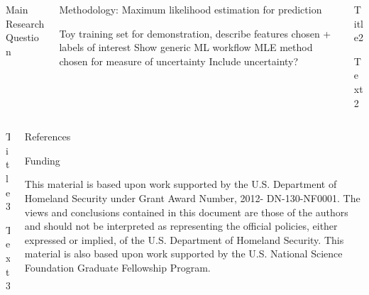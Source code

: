 \documentclass{beamer}
\begin{document}
\begin{frame}[t]{}
\begin{columns}
\begin{column}[T]{0.72\textwidth}
\begin{columns}[t]
\begin{column}{0.32\textwidth}
\begin{block}{Main Research Question}
\end{block}
\end{column}

\begin{column}{0.42\textwidth}
\begin{block}{Methodology: Maximum likelihood estimation for prediction}

Toy training set for demonstration, describe features chosen + labels of interest
Show generic ML workflow
MLE method chosen for measure of uncertainty 
Include uncertainty? 

\end{block}
\end{column}

\begin{column}{0.24\textwidth}
\begin{block}{Title2}

Text2

\end{block}
\end{column}
\end{columns}

\begin{columns}[t]
\begin{column}{0.6\textwidth}
\begin{block}{Title3}

Text3

\end{block}
\end{column}

\begin{column}{0.4\textwidth}
\begin{block}{\large References}
\printbibliography
\end{block}

\begin{block}{\large Funding}

This material is based upon work supported by the U.S. Department of Homeland
Security under Grant Award Number, 2012- DN-130-NF0001. The views and
conclusions contained in this document are those of the authors and should not
be interpreted as representing the official policies, either expressed or
implied, of the U.S. Department of Homeland Security. This material is also
based upon work supported by the U.S. National Science Foundation Graduate
Fellowship Program.


\end{block}
\end{column}
\end{columns}
\end{column}
\end{columns}
\end{frame}
\end{document}
